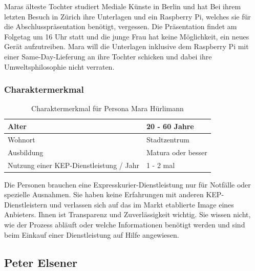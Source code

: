 Maras älteste Tochter studiert Mediale Künste in Berlin und hat Bei ihrem letzten Besuch in Zürich ihre Unterlagen und ein Raspberry Pi, welches sie für die Abschlusspräsentation benötigt, vergessen. Die Präsentation findet am Folgetag um 16 Uhr statt und die junge Frau hat keine Möglichkeit, ein neues Gerät aufzutreiben. Mara will die Unterlagen inklusive dem Raspberry Pi mit einer Same-Day-Lieferung an ihre Tochter schicken und dabei ihre Umweltsphilosophie nicht verraten.

\subsubsection{Charaktermerkmal}
\begin{table}[]
\centering

\label{my-label}
\begin{tabular}{|l|l|}
\hline
Alter                                   & 20 - 60 Jahre        \\ \hline
Wohnort                                 & Stadtzentrum         \\ \hline
Ausbildung                              & Matura oder besser \\ \hline
Nutzung einer KEP-Dienstleistung / Jahr & 1 - 2 mal            \\ \hline
\end{tabular}
\caption{Charaktermerkmal für Persona Mara Hürlimann}
\end{table}

Die Personen brauchen eine Expresskurier-Dienstleistung nur für Notfälle oder spezielle Ausnahmen. Sie haben keine Erfahrungen mit anderen KEP-Dienstleistern und verlassen sich auf das im Markt etablierte Image eines Anbieters. Ihnen ist Transparenz und Zuverlässigkeit wichtig. Sie wissen nicht, wie der Prozess abläuft oder welche Informationen benötigt werden und sind beim Einkauf einer Dienstleistung auf Hilfe angewiesen.



\subsection{Peter Elsener}

